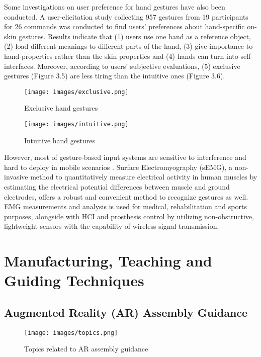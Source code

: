 \documentclass[fyp]{socreport}
\begin{document}
Some investigations on user preference for hand gestures have also been conducted. A user-elicitation study \cite{bostan2017hands} collecting 957 gestures from 19 participants for 26 commands was conducted to find users' preferences about hand-specific on-skin gestures. Results indicate that (1) users use one hand as a reference object, (2) load different meanings to different parts of the hand, (3) give importance to hand-properties rather than the skin properties and (4) hands can turn into self-interfaces. Moreover, according to users' subjective evaluations, (5) exclusive gestures (Figure 3.5) are less tiring than the intuitive ones (Figure 3.6). 

\begin{figure}[H]
\centering
\caption{Exclusive hand gestures}
\cite{bostan2017hands}

\texttt{[image: images/exclusive.png]}
\centering
\end{figure}

\begin{figure}[H]
\centering
\caption{Intuitive hand gestures}
\cite{bostan2017hands}

\texttt{[image: images/intuitive.png]}
\centering
\end{figure}

However, most of gesture-based input systems are sensitive to interference and hard to deploy in mobile scenarios \cite{shatilov2019emerging}. Surface Electromyography (sEMG), a non-invasive method to quantitatively measure electrical activity in human muscles by estimating the electrical potential differences between muscle and ground electrodes, offers a robust and convenient method to recognize gestures as well. EMG measurements and analysis is used for medical, rehabilitation and sports purposes, alongside with HCI and prosthesis control by utilizing non-obstructive, lightweight sensors with the capability of wireless signal transmission.

\section{Manufacturing, Teaching and Guiding Techniques}
\subsection{Augmented Reality (AR) Assembly Guidance}

\begin{figure}[H]
\centering
\caption{Topics related to AR assembly guidance}
\cite{wang2016comprehensive}
\texttt{[image: images/topics.png]}
\centering
\end{figure}
\end{document}
